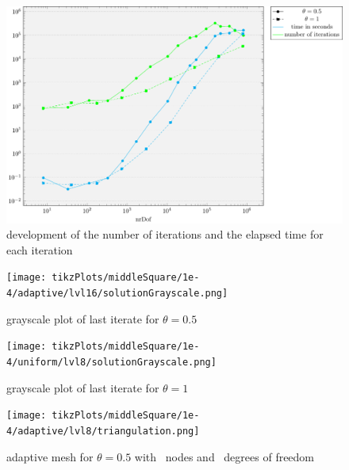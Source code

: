 \documentclass[draft=false,twoside,12pt]{scrreprt}
\begin{document}
\begin{figure}[H]
	\centering
	\includegraphics[width=16cm]{tikzPlots/middleSquare/misc.pdf}
  \caption{development of the number of iterations and the elapsed time for 
  each iteration}
\end{figure}

\begin{minipage}[t]{0.5\textwidth}
  \begin{figure}[H]
	  \centering
		\texttt{[image: tikzPlots/middleSquare/1e-4/adaptive/lvl16/solutionGrayscale.png]}
    \caption{grayscale plot of last iterate for $\theta = 0.5$}
  \end{figure}
\end{minipage}
\begin{minipage}[t]{0.5\textwidth}
  \begin{figure}[H]
	  \centering
		\texttt{[image: tikzPlots/middleSquare/1e-4/uniform/lvl8/solutionGrayscale.png]}
    \caption{grayscale plot of last iterate for $\theta = 1$}
  \end{figure}
\end{minipage}


\begin{figure}[H]
	\centering
  \texttt{[image: tikzPlots/middleSquare/1e-4/adaptive/lvl8/triangulation.png]}
  \caption{adaptive mesh for $\theta = 0.5$ with \nrNodes\ nodes and 
  \nrDof\ degrees of freedom}
\end{figure}

\end{document}
